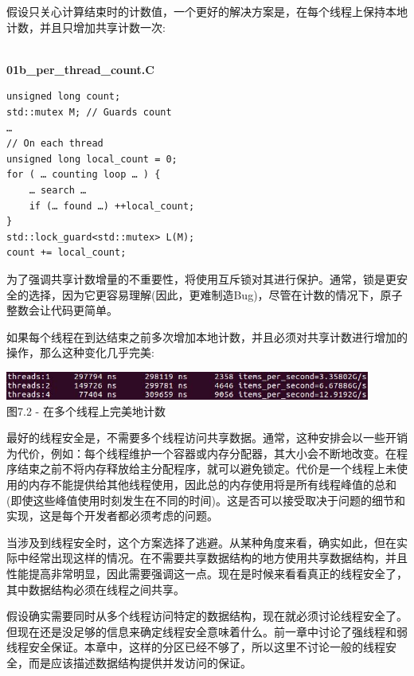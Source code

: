 假设只关心计算结束时的计数值，一个更好的解决方案是，在每个线程上保持本地计数，并且只增加共享计数一次:

\hspace*{\fill} \\ %
\noindent
\textbf{01b\_per\_thread\_count.C}
\begin{lstlisting}[style=styleCXX]
unsigned long count;
std::mutex M; // Guards count
…
// On each thread
unsigned long local_count = 0;
for ( … counting loop … ) {
	… search …
	if (… found …) ++local_count;
}
std::lock_guard<std::mutex> L(M);
count += local_count;
\end{lstlisting}

为了强调共享计数增量的不重要性，将使用互斥锁对其进行保护。通常，锁是更安全的选择，因为它更容易理解(因此，更难制造Bug)，尽管在计数的情况下，原子整数会让代码更简单。

如果每个线程在到达结束之前多次增加本地计数，并且必须对共享计数进行增加的操作，那么这种变化几乎完美:

\begin{center}
\includegraphics[width=0.9\textwidth]{content/2/chapter7/images/2.jpg}\\
图7.2 - 在多个线程上完美地计数
\end{center}

最好的线程安全是，不需要多个线程访问共享数据。通常，这种安排会以一些开销为代价，例如：每个线程维护一个容器或内存分配器，其大小会不断地改变。在程序结束之前不将内存释放给主分配程序，就可以避免锁定。代价是一个线程上未使用的内存不能提供给其他线程使用，因此总的内存使用将是所有线程峰值的总和(即使这些峰值使用时刻发生在不同的时间)。这是否可以接受取决于问题的细节和实现，这是每个开发者都必须考虑的问题。

当涉及到线程安全时，这个方案选择了逃避。从某种角度来看，确实如此，但在实际中经常出现这样的情况。在不需要共享数据结构的地方使用共享数据结构，并且性能提高非常明显，因此需要强调这一点。现在是时候来看看真正的线程安全了，其中数据结构必须在线程之间共享。


假设确实需要同时从多个线程访问特定的数据结构，现在就必须讨论线程安全了。但现在还是没足够的信息来确定线程安全意味着什么。前一章中讨论了强线程和弱线程安全保证。本章中，这样的分区已经不够了，所以这里不讨论一般的线程安全，而是应该描述数据结构提供并发访问的保证。

